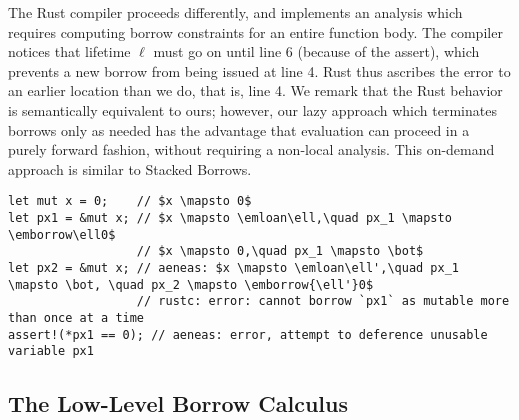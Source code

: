 \documentclass[acmsmall,screen]{acmart}
\newcommand\emborrow[2]{\ensuremath{\mathsf{borrow}^m\,#1\;#2}}
\newcommand\emloan[1]{\ensuremath{\mathsf{loan}^m\,#1}}
\begin{document}
The Rust compiler proceeds differently, and implements an analysis which
requires computing borrow constraints for an entire function body.
The compiler notices that lifetime $\ell$ must go on until line 6 (because of
the assert), which prevents a new borrow from being issued at line 4. Rust
thus ascribes the error to an earlier location than we do, that is, line 4.
We remark that the Rust behavior is semantically equivalent to ours; however, our
lazy approach which terminates borrows only as needed has the advantage that
evaluation can proceed in a purely forward fashion, without requiring a
non-local analysis. This on-demand approach is similar to Stacked
Borrows.

\begin{verbatim}
let mut x = 0;    // $x \mapsto 0$
let px1 = &mut x; // $x \mapsto \emloan\ell,\quad px_1 \mapsto \emborrow\ell0$
                  // $x \mapsto 0,\quad px_1 \mapsto \bot$
let px2 = &mut x; // aeneas: $x \mapsto \emloan\ell',\quad px_1 \mapsto \bot, \quad px_2 \mapsto \emborrow{\ell'}0$
                  // rustc: error: cannot borrow `px1` as mutable more than once at a time
assert!(*px1 == 0); // aeneas: error, attempt to deference unusable variable px1
\end{verbatim}
\fi

\subsection{The Low-Level Borrow Calculus}
\label{sec:llbc}

\newcommand*\ruleline[1]{\par\noindent\raisebox{.5ex}{\makebox[\linewidth]{\hrulefill\hspace{1ex}\raisebox{-.5ex}{#1}\hspace{1ex}\hrulefill}}}
\end{document}
